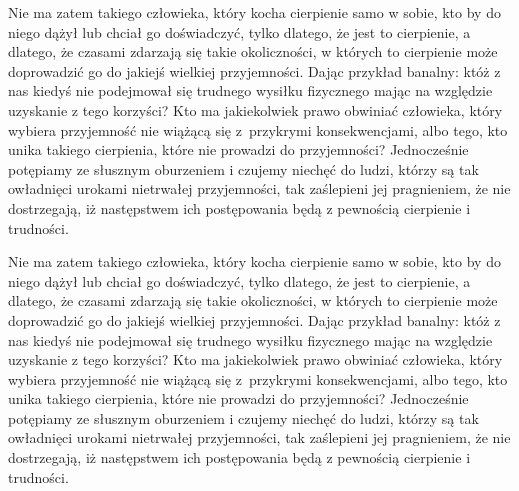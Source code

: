 \documentclass[12pt]{mwbk}
\theoremstyle{plain}
\theoremstyle{definition}
\theoremstyle{remark}
\begin{document}
Nie ma zatem takiego człowieka, który kocha cierpienie samo w sobie, 
kto by do niego dążył lub chciał go doświadczyć, tylko dlatego, że
jest to cierpienie, a dlatego, że czasami zdarzają się takie 
okoliczności, w których to cierpienie może doprowadzić 
go do jakiejś wielkiej przyjemności. 
Dając przykład banalny: któż z nas kiedyś nie podejmował 
się trudnego wysiłku fizycznego mając na względzie 
uzyskanie z tego korzyści? 
Kto ma jakiekolwiek prawo obwiniać człowieka, 
który wybiera przyjemność nie wiążącą się z~przykrymi 
konsekwencjami, albo tego, kto unika takiego cierpienia, 
które nie prowadzi do przyjemności? 
Jednocześnie potępiamy ze słusznym oburzeniem i czujemy 
niechęć do ludzi, którzy są tak owładnięci urokami nietrwałej 
przyjemności, tak zaślepieni jej pragnieniem, 
że nie dostrzegają, iż następstwem ich 
postępowania będą z pewnością cierpienie i trudności.

Nie ma zatem takiego człowieka, który kocha cierpienie samo w sobie, 
kto by do niego dążył lub chciał go doświadczyć, tylko dlatego, że
jest to cierpienie, a dlatego, że czasami zdarzają się takie 
okoliczności, w których to cierpienie może doprowadzić 
go do jakiejś wielkiej przyjemności. 
Dając przykład banalny: któż z nas kiedyś nie podejmował 
się trudnego wysiłku fizycznego mając na względzie 
uzyskanie z tego korzyści? 
Kto ma jakiekolwiek prawo obwiniać człowieka, 
który wybiera przyjemność nie wiążącą się z~przykrymi 
konsekwencjami, albo tego, kto unika takiego cierpienia, 
które nie prowadzi do przyjemności? 
Jednocześnie potępiamy ze słusznym oburzeniem i czujemy 
niechęć do ludzi, którzy są tak owładnięci urokami nietrwałej 
przyjemności, tak zaślepieni jej pragnieniem, 
że nie dostrzegają, iż następstwem ich 
postępowania będą z pewnością cierpienie i trudności.
\end{document}
